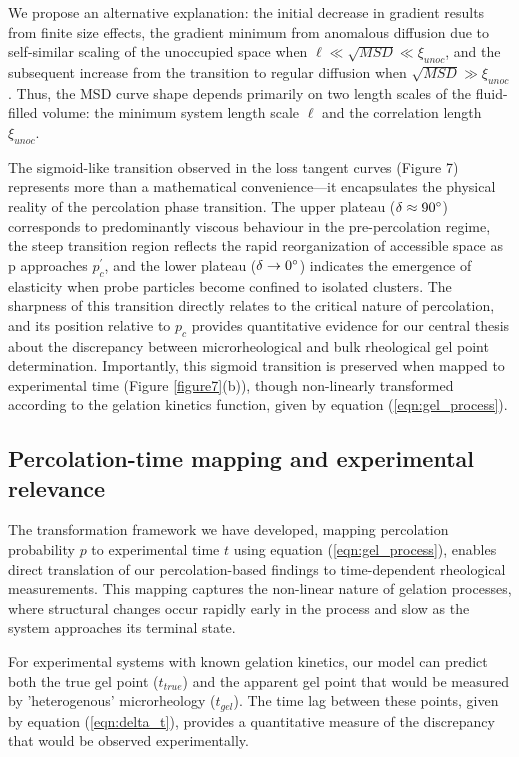 \documentclass[%
 aip,
 amsmath,amssymb,
reprint, onecolumn %
]{revtex4-1}
\begin{document}
We propose an alternative explanation: the initial decrease in gradient results from finite size effects, the gradient minimum from anomalous diffusion due to self-similar scaling of the unoccupied space when $\ell \ll \sqrt{MSD} \ll \xi_{unoc}$, and the subsequent increase from the transition to regular diffusion when $\sqrt{MSD} \gg \xi_{unoc}$. Thus, the MSD curve shape depends primarily on two length scales of the fluid-filled volume: the minimum system length scale $\ell$ and the correlation length $\xi_{unoc}$.

The sigmoid-like transition observed in the loss tangent curves (Figure 7) represents more than a mathematical convenience—it encapsulates the physical reality of the percolation phase transition. The upper plateau ($\delta \approx90\degree$) corresponds to predominantly viscous behaviour in the pre-percolation regime, the steep transition region reflects the rapid reorganization of accessible space as p approaches $p_{c}^{'}$, and the lower plateau ($\delta \to 0\degree$) indicates the emergence of elasticity when probe particles become confined to isolated clusters. The sharpness of this transition directly relates to the critical nature of percolation, and its position relative to $p_c$ provides quantitative evidence for our central thesis about the discrepancy between microrheological and bulk rheological gel point determination. Importantly, this sigmoid transition is preserved when mapped to experimental time (Figure \ref{figure7}(b)), though non-linearly transformed according to the gelation kinetics function, given by equation (\ref{eqn:gel_process}).



\subsection{Percolation-time mapping and experimental relevance}

The transformation framework we have developed, mapping percolation probability $p$ to experimental time $t$ using equation (\ref{eqn:gel_process}), enables direct translation of our percolation-based findings to time-dependent rheological measurements. This mapping captures the non-linear nature of gelation processes, where structural changes occur rapidly early in the process and slow as the system approaches its terminal state.

For experimental systems with known gelation kinetics, our model can predict both the true gel point ($t_{true}$) and the apparent gel point that would be measured by 'heterogenous' microrheology ($t_{gel}$). The time lag between these points, given by equation (\ref{eqn:delta_t}), provides a quantitative measure of the discrepancy that would be observed experimentally.
\end{document}
